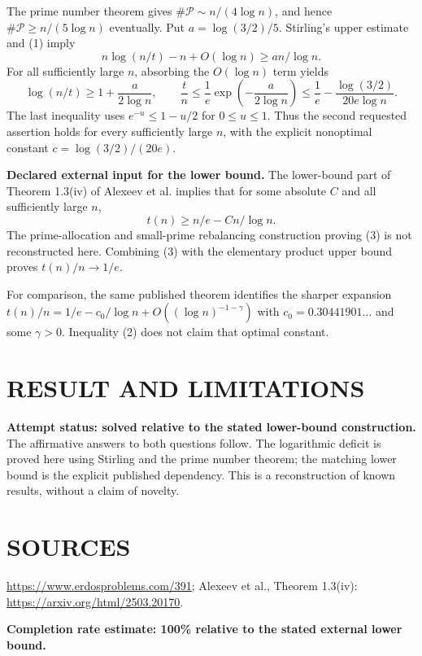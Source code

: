 The prime number theorem gives $\#\mathcal P\sim n/(4\log n)$, and hence $\#\mathcal P\geq n/(5\log n)$ eventually. Put $a=\log(3/2)/5$. Stirling's upper estimate and (1) imply
\[
n\log(n/t)-n+O(\log n)\geq a n/\log n.
\]
For all sufficiently large $n$, absorbing the $O(\log n)$ term yields
\[
\log(n/t)\geq1+\frac a{2\log n},\qquad
\frac tn\leq\frac1e\exp\!\left(-\frac a{2\log n}\right)
\leq\frac1e-\frac{\log(3/2)}{20e\log n}.                 \tag{2}
\]
The last inequality uses $e^{-u}\leq1-u/2$ for $0\leq u\leq1$. Thus the second requested assertion holds for every sufficiently large $n$, with the explicit nonoptimal constant $c=\log(3/2)/(20e)$.

\textbf{Declared external input for the lower bound.} The lower-bound part of Theorem 1.3(iv) of Alexeev et al. implies that for some absolute $C$ and all sufficiently large $n$,
\[
t(n)\geq n/e-Cn/\log n.                                 \tag{3}
\]
The prime-allocation and small-prime rebalancing construction proving (3) is not reconstructed here. Combining (3) with the elementary product upper bound proves $t(n)/n\to1/e$.

For comparison, the same published theorem identifies the sharper expansion $t(n)/n=1/e-c_0/\log n+O((\log n)^{-1-\gamma})$ with $c_0=0.30441901\ldots$ and some $\gamma>0$. Inequality (2) does not claim that optimal constant.

\section{RESULT AND LIMITATIONS}
\textbf{Attempt status: solved relative to the stated lower-bound construction.} The affirmative answers to both questions follow. The logarithmic deficit is proved here using Stirling and the prime number theorem; the matching lower bound is the explicit published dependency. This is a reconstruction of known results, without a claim of novelty.

\section{SOURCES}
\url{https://www.erdosproblems.com/391}; Alexeev et al., Theorem 1.3(iv): \url{https://arxiv.org/html/2503.20170}.

\textbf{Completion rate estimate: 100\% relative to the stated external lower bound.}
